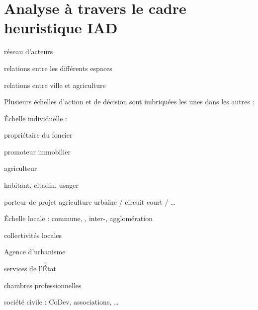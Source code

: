 \section{Analyse à travers le cadre heuristique IAD}

\startplacefigure[location=middle,
short={Analyse de l'étalement urbain à travers le cadre IAD},
title={Analyse de l'étalement urbain à travers le cadre IAD.
       Adapté de \citet{ostrom_background_2011} }]
\stopplacefigure






\startitemize[packed]

\item réseau d'acteurs
\item relations entre les différents espaces
\item relations entre ville et agriculture

\stopitemize


Plusieurs échelles d'action et de décision
sont imbriquées les unes dans les autres :

\startcolumns[2]
\startitemize[a,packed]

\item Échelle individuelle :

	\startitemize[packed]
		\item propriétaire du foncier
		\item promoteur immobilier
		\item agriculteur
		\item habitant, citadin, usager
		\item porteur de projet agriculture urbaine / circuit court / \dots
	\stopitemize

\item Échelle locale : commune, \SCoT, inter-\SCoT, agglomération

	\startitemize[packed]

		\item collectivités locales
		\item Agence d'urbanisme
		\item services de l'État
		\item chambres professionnelles
		\item société civile : CoDev, associations, \dots

